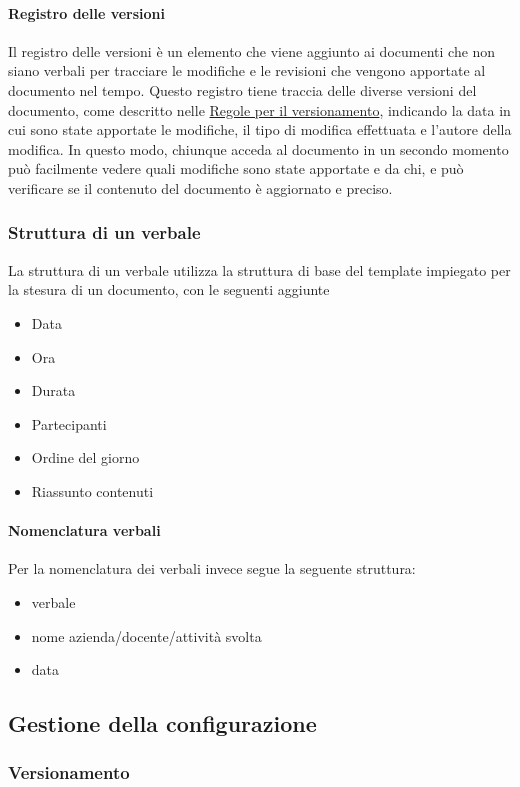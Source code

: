 \documentclass[12pt]{article}
\begin{document}
\paragraph{Registro delle versioni}
Il registro delle versioni è un elemento che viene aggiunto ai documenti che non siano verbali per tracciare le modifiche e le revisioni che vengono apportate al documento nel tempo.
 Questo registro tiene traccia delle diverse versioni del documento, come descritto nelle \hyperref[ver]{Regole per il versionamento}, indicando la data in cui sono state apportate le modifiche, il tipo di modifica effettuata e l'autore della modifica. In questo modo, chiunque acceda al documento in un secondo momento può facilmente vedere quali modifiche sono state apportate e da chi, e può verificare se il contenuto del documento è aggiornato e preciso.
\subsubsection{Struttura di un verbale}
La struttura di un verbale utilizza la struttura di base del template impiegato per la stesura di un documento, con le seguenti aggiunte
\begin{itemize}
    \item Data
    \item Ora
    \item Durata
    \item Partecipanti
    \item Ordine del giorno
    \item Riassunto contenuti
\end{itemize}
\paragraph{Nomenclatura verbali}
Per la nomenclatura dei verbali invece segue la seguente struttura:
\begin{itemize}
    \item verbale
    \item nome azienda/docente/attività svolta
    \item data
\end{itemize}

\subsection{Gestione della configurazione}
\subsubsection{Versionamento}
\end{document}
